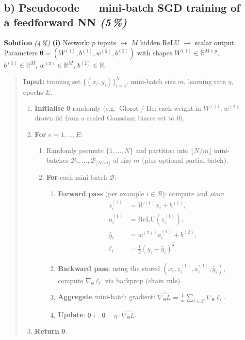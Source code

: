 \documentclass[11pt,a4paper]{article}
\newcommand{\subpoints}[1]{\textit{(#1\,\%)}}
\newcommand{\sol}{\noindent\textbf{Solution}}
\begin{document}
\subsection*{b) Pseudocode --- mini-batch SGD training of a feedforward NN \subpoints{5}}

\sol{} \subpoints{4} \textbf{(i)} Network: $p$ inputs $\to$ $M$ hidden ReLU $\to$ scalar output.
Parameters $\bm\theta = (W^{(1)}, b^{(1)}, w^{(2)}, b^{(2)})$ with shapes $W^{(1)} \in \mathbb R^{M\times p}$,
$b^{(1)} \in \mathbb R^M$, $w^{(2)} \in \mathbb R^M$, $b^{(2)} \in \mathbb R$.

\begin{quote}\small
\textbf{Input:} training set $\{(x_i, y_i)\}_{i=1}^N$, mini-batch size $m$, learning rate $\eta$,
epochs $E$.
\begin{enumerate}
  \item \textbf{Initialise} $\bm\theta$ randomly (e.g.\ Glorot / He: each weight in $W^{(1)}, w^{(2)}$
        drawn iid from a scaled Gaussian; biases set to $0$).
  \item \textbf{For} $e = 1, \dots, E$:
    \begin{enumerate}
      \item Randomly permute $\{1,\dots,N\}$ and partition into $\lfloor N/m \rfloor$ mini-batches
            $\mathcal B_1, \dots, \mathcal B_{\lfloor N/m \rfloor}$ of size $m$ (plus optional
            partial batch).
      \item \textbf{For} each mini-batch $\mathcal B$:
        \begin{enumerate}
          \item \textbf{Forward pass} (per example $i \in \mathcal B$): compute and \emph{store}
            \begin{align*}
              z_i^{(1)} &= W^{(1)} x_i + b^{(1)}, \\
              a_i^{(1)} &= \mathrm{ReLU}(z_i^{(1)}), \\
              \hat y_i &= w^{(2)\top} a_i^{(1)} + b^{(2)}, \\
              \ell_i &= \tfrac{1}{2}(y_i - \hat y_i)^2.
            \end{align*}
          \item \textbf{Backward pass}: using the stored $(x_i, z_i^{(1)}, a_i^{(1)}, \hat y_i)$,
            compute $\nabla_{\bm\theta}\ell_i$ via backprop (chain rule).
          \item \textbf{Aggregate} mini-batch gradient:
            $\widehat{\nabla_{\bm\theta} L} = \frac{1}{m}\sum_{i\in\mathcal B}\nabla_{\bm\theta}\ell_i$.
          \item \textbf{Update}: $\bm\theta \leftarrow \bm\theta - \eta\cdot\widehat{\nabla_{\bm\theta} L}$.
        \end{enumerate}
    \end{enumerate}
  \item \textbf{Return} $\bm\theta$.
\end{enumerate}
\end{quote}
\end{document}
